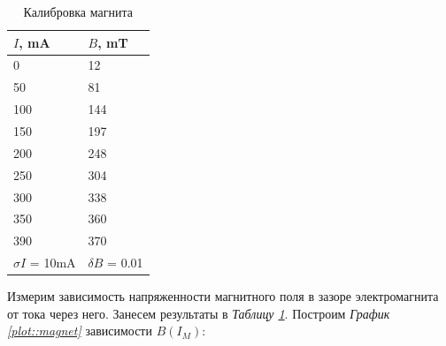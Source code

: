 \documentclass[a4paper]{article}
\begin{document}
\begin{table}[ht]
\begin{minipage}{0.3\textwidth}
    \centering
    \begin{tabular}{|l|l|}
        \hline
        $I$, mA           & $B$, mT           \\ \hline
        0                 & 12                \\ \hline
        50                & 81                \\ \hline
        100               & 144               \\ \hline
        150               & 197               \\ \hline
        200               & 248               \\ \hline
        250               & 304               \\ \hline
        300               & 338               \\ \hline
        350               & 360               \\ \hline
        390               & 370               \\ \hline
        $\sigma I$ = 10mA & $\delta B$ = 0.01 \\ \hline
    \end{tabular}
    \label{table::magnet}
    \caption{Калибровка магнита}
\end{minipage}
\begin{minipage}{0.3\textwidth}
    Измерим зависимость напряженности магнитного поля в зазоре электромагнита от тока через него. Занесем результаты в \textit{Таблицу \ref{table::magnet}}. Построим \textit{График \ref{plot::magnet}} зависимости $B(I_M)$:\\
\end{minipage}
\begin{minipage}{0.5\textwidth}
\end{minipage}
\end{table}
\end{document}
